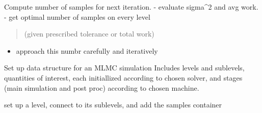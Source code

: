 \documentclass[letterpaper,10pt,english]{sphinxmanual}
\begin{document}
\begin{fulllineitems}
\begin{fulllineitems}
\label{\detokenize{uqmethod:uqmethod.mlmc.Mlmc.defaults_add}}
\end{fulllineitems}


\begin{fulllineitems}
\label{\detokenize{uqmethod:uqmethod.mlmc.Mlmc.prepare_next_iteration}}
Compute number of samples for next iteration. 
- evaluate sigma\textasciicircum{}2 and avg work. 
- get optimal number of samples on every level
\begin{quote}

(given prescribed tolerance or total work)
\end{quote}
\begin{itemize}
\item {} 
approach this numbr carefully and iteratively

\end{itemize}

\end{fulllineitems}


\begin{fulllineitems}
\label{\detokenize{uqmethod:uqmethod.mlmc.Mlmc.setup}}
Set up data structure for an MLMC simulation
Includes levels and sublevels, quantities of interest, 
each initiallized according to chosen solver, 
and stages (main simulation and post proc) according to
chosen machine.

\end{fulllineitems}


\begin{fulllineitems}
\label{\detokenize{uqmethod:uqmethod.mlmc.Mlmc.setup_level}}
set up a level, connect to its sublevels, and 
add the samples container


\end{fulllineitems}
\end{fulllineitems}
\end{document}
